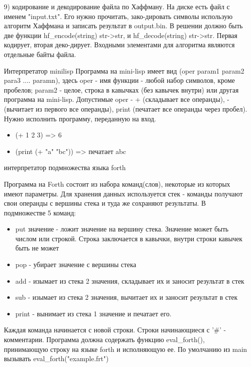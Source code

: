 \documentclass{article}
\begin{document}
9) кодирование и декодирование файла по Хаффману. 
На диске есть файл с именем "input.txt". Его нужно прочитать, зако-дировать символы 
использую алгоритм Хаффмана и записать результат в output.bin. В решении должно быть две функции 
hf_encode(string) str->str, и hf_decode(string) str->str. Первая кодирует, вторая деко-дирует. 
Входными элементами для алгоритма являются отдельные байты файла.

{\center Интерпретатор minilisp}
Программа на mini-lisp имеет вид (oper param1 param2 para3 .... paramn),
здесь oper - имя функции - любой набор символов, кроме пробелов;
param2 - целое, строка в кавычках (без кавычек внутри) или другая программа на mini-lisp.
Допустимые oper - + (складывает все операнды), - (вычитает из первого все операнды), 
print (печатает все операнды через пробел). Нужно исполнить программу, переданную на вход.

\begin{itemize}
    \item (+ 1 2 3) => 6
    \item (print (+ "a" "bc")) => печатает abc
\end{itemize}
\newpage


{\center интерпретатор подмножества языка forth}

Программа на Forth состоит из набора команд(слов), некоторые
из которых имеют параметры. Для хранения данных используется
стек - команды получают свои операнды с вершины стека и туда
же сохраняют результаты. В подмножестве 5 команд:

\begin{itemize}
    \item put значение - ложит значение на вершину стека. Значение может
быть числом или строкой. Строка заключается в кавычки, внутри
строки кавычек быть не может
    \item pop - убирает значение с вершины стека
    \item add - изымает из стека 2 значения, складывает их и заносит результат в стек
    \item sub - изымает из стека 2 значения, вычитает их и заносит результат в стек
    \item print - вынимает из стека 1 значение и печатает его.
\end{itemize}

Каждая команда начинается с новой строки. Строки начинающиеся с '\#' - комментарии. 
Программа должна содержать функцию eval_forth(), принимающую строку на языке forth и исполняющую ее. 
По умолчанию из main вызывать eval_forth("example.frt")
\end{document}

